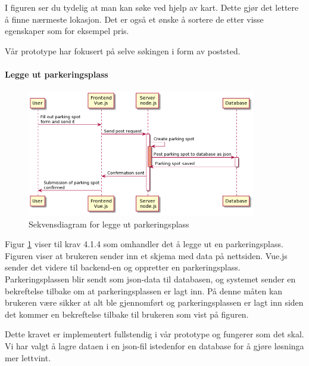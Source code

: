 I figuren ser du tydelig at man kan søke ved hjelp av kart. Dette gjør det lettere å finne nærmeste lokasjon. Det er også et ønske å sortere de etter visse egenskaper som for eksempel pris.

Vår prototype har fokusert på selve søkingen i form av poststed. 
\paragraph{Legge ut parkeringsplass}
\begin{figure}[H]
    \centering
    \includegraphics[width=10cm]{bilder/uml/legge_parkeringsplasss.png}
    \caption{Sekvensdiagram for legge ut parkeringsplass}
    \label{fig:legge}
\end{figure}
Figur \ref{fig:legge} viser til krav 4.1.4 som omhandler det å legge ut en parkeringsplass. Figuren viser at brukeren sender inn et skjema med data på nettsiden. Vue.js sender det videre til backend-en og oppretter en parkeringsplass. Parkeringsplassen blir sendt som json-data til databasen, og systemet sender en bekreftelse tilbake om at parkeringsplassen er lagt inn. På denne måten kan brukeren være sikker at alt ble gjennomført og parkeringsplassen er lagt inn siden det kommer en bekreftelse tilbake til brukeren som vist på figuren. 

Dette kravet er implementert fullstendig i vår prototype og fungerer som det skal. Vi har valgt å lagre dataen i en json-fil istedenfor en database for å gjøre løsninga mer lettvint.  
 
